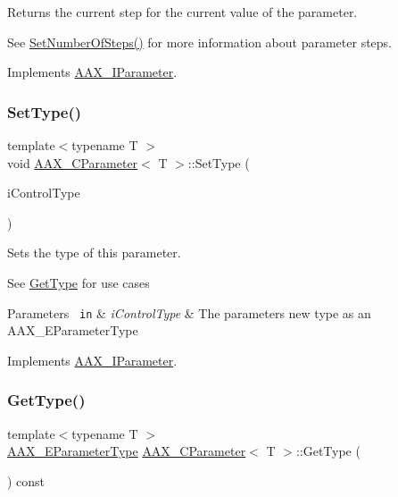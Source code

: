 Returns the current step for the current value of the parameter. 

See \mbox{\hyperlink{a01537_ac1c0ee92affe0379a58411955d27bb2b}{Set\+Number\+Of\+Steps()}} for more information about parameter steps. 

Implements \mbox{\hyperlink{a01857_a9f92e51fce44dbf25a7265286c72d0ea}{A\+A\+X\+\_\+\+I\+Parameter}}.

\mbox{\label{a01537_a9e02554bfbcc0b7d2598c57d1e2f186c}} 
\subsubsection{\texorpdfstring{SetType()}{SetType()}}
{\footnotesize\ttfamily template$<$typename T $>$ \\
void \mbox{\hyperlink{a01537}{A\+A\+X\+\_\+\+C\+Parameter}}$<$ T $>$\+::Set\+Type (\begin{DoxyParamCaption}\item[{\mbox{\hyperlink{a00491_a4cd0f189daa9a60cf36883c56344bb2e}{A\+A\+X\+\_\+\+E\+Parameter\+Type}}}]{i\+Control\+Type }\end{DoxyParamCaption})\hspace{0.3cm}{\ttfamily [virtual]}}



Sets the type of this parameter. 

See \mbox{\hyperlink{a01537_a0a7163ae07746260e3f6be4a6c974e4c}{Get\+Type}} for use cases


\begin{DoxyParams}[1]{Parameters}
\mbox{\texttt{ in}}  & {\em i\+Control\+Type} & The parameter\textquotesingle{}s new type as an A\+A\+X\+\_\+\+E\+Parameter\+Type \\
\hline
\end{DoxyParams}


Implements \mbox{\hyperlink{a01857_ac03b38e048e92dd2ec086f9041b52c54}{A\+A\+X\+\_\+\+I\+Parameter}}.

\mbox{\label{a01537_a0a7163ae07746260e3f6be4a6c974e4c}} 
\subsubsection{\texorpdfstring{GetType()}{GetType()}}
{\footnotesize\ttfamily template$<$typename T $>$ \\
\mbox{\hyperlink{a00491_a4cd0f189daa9a60cf36883c56344bb2e}{A\+A\+X\+\_\+\+E\+Parameter\+Type}} \mbox{\hyperlink{a01537}{A\+A\+X\+\_\+\+C\+Parameter}}$<$ T $>$\+::Get\+Type (\begin{DoxyParamCaption}{ }\end{DoxyParamCaption}) const\hspace{0.3cm}{\ttfamily [virtual]}}



